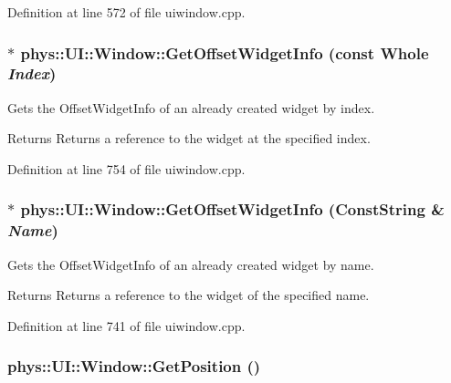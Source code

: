 Definition at line 572 of file uiwindow.cpp.

\hypertarget{classphys_1_1UI_1_1Window_a7c87561dd83402f852c98c18fce675eb}{
\subsubsection[{GetOffsetWidgetInfo}]{ $\ast$ phys::UI::Window::GetOffsetWidgetInfo (const {\bf Whole} {\em Index})}}
\label{d4/d86/classphys_1_1UI_1_1Window_a7c87561dd83402f852c98c18fce675eb}


Gets the OffsetWidgetInfo of an already created widget by index. 

\begin{DoxyReturn}{Returns}
Returns a reference to the widget at the specified index. 
\end{DoxyReturn}


Definition at line 754 of file uiwindow.cpp.

\hypertarget{classphys_1_1UI_1_1Window_a77a2091e41766344253cac55af650f54}{
\subsubsection[{GetOffsetWidgetInfo}]{ $\ast$ phys::UI::Window::GetOffsetWidgetInfo ({\bf ConstString} \& {\em Name})}}
\label{d4/d86/classphys_1_1UI_1_1Window_a77a2091e41766344253cac55af650f54}


Gets the OffsetWidgetInfo of an already created widget by name. 

\begin{DoxyReturn}{Returns}
Returns a reference to the widget of the specified name. 
\end{DoxyReturn}


Definition at line 741 of file uiwindow.cpp.

\hypertarget{classphys_1_1UI_1_1Window_a29fca96d9a2dab29d77a36d6a329f306}{
\subsubsection[{GetPosition}]{ phys::UI::Window::GetPosition ()}}
\label{d4/d86/classphys_1_1UI_1_1Window_a29fca96d9a2dab29d77a36d6a329f306}


